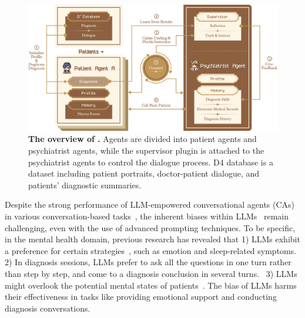 \begin{figure}[!t]
    \centering
    \includegraphics[width=1\linewidth]{fig/system_v8.png}
    \caption{\textbf{The overview of \system.} Agents are divided into patient agents and psychiatrist agents, while the supervisor plugin is attached to the psychiatrist agents to control the dialogue process. D4 database is a dataset including patient portraits, doctor-patient dialogue, and patients' diagnostic summaries. %
    }
    \label{fig:overview}
\end{figure}


Despite the strong performance of LLM-empowered conversational agents (CAs) in various conversation-based tasks~\cite{wu2023autogenenablingnextgenllm, Shi2023LLMMiniCEXAE, chen2023llmempoweredchatbotspsychiatristpatient}, the inherent biases within LLMs~\cite{yeh-etal-2023-evaluating, xu2024prideprejudicellmamplifies} remain challenging, even with the use of advanced prompting techniques. To be specific, in the mental health domain, previous research has revealed that 1) LLMs exhibit a preference for certain strategies~\cite{kang2024largelanguagemodelsgood, chen2023llmempoweredchatbotspsychiatristpatient}, such as emotion and sleep-related symptoms. 2) In diagnosis sessions, LLMs prefer to ask all the questions in one turn rather than step by step, and come to a diagnosis conclusion in several turns.~\cite{chen2023llmempoweredchatbotspsychiatristpatient} 3) LLMs might overlook the potential mental states of patients~\cite{jin2024psyevalsuitementalhealth}. The bias of LLMs harms their effectiveness in tasks like providing emotional support and conducting diagnosis conversations.  

